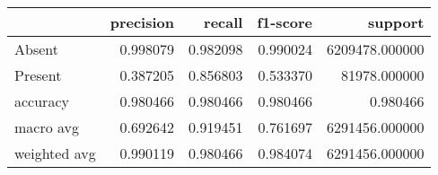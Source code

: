 \begin{tabular}{lrrrr}
\toprule
 & precision & recall & f1-score & support \\
\midrule
Absent & 0.998079 & 0.982098 & 0.990024 & 6209478.000000 \\
Present & 0.387205 & 0.856803 & 0.533370 & 81978.000000 \\
accuracy & 0.980466 & 0.980466 & 0.980466 & 0.980466 \\
macro avg & 0.692642 & 0.919451 & 0.761697 & 6291456.000000 \\
weighted avg & 0.990119 & 0.980466 & 0.984074 & 6291456.000000 \\
\bottomrule
\end{tabular}
